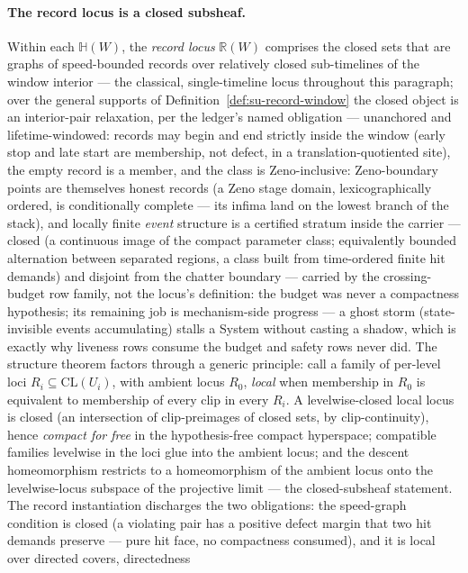 \paragraph{The record locus is a closed subsheaf.} Within each
$\mathbb{H}(W)$, the \emph{record locus} $\mathbb{R}(W)$ comprises
the closed sets that are graphs of speed-bounded records over
relatively closed sub-timelines of the window interior --- the
classical, single-timeline locus throughout this paragraph; over
the general supports of
Definition~\ref{def:su-record-window} the closed object is an
interior-pair relaxation, per the ledger's named obligation ---
unanchored and lifetime-windowed: records may begin and end strictly
inside the window (early stop and late start are membership, not
defect, in a translation-quotiented site), the empty record is a
member, and the class is Zeno-inclusive: Zeno-boundary points are
themselves honest records (a Zeno stage domain, lexicographically
ordered, is conditionally complete --- its infima land on the lowest
branch of the stack), and locally finite \emph{event}
structure is a certified stratum inside the carrier --- closed (a
continuous image of the compact parameter class; equivalently
bounded alternation between separated regions, a class built from
time-ordered finite hit demands) and disjoint from the chatter
boundary --- carried by the
crossing-budget row family, not the locus's definition: the budget
was never a compactness hypothesis; its remaining job is
mechanism-side progress --- a ghost storm (state-invisible events
accumulating) stalls a System without casting a shadow, which is
exactly why liveness rows consume the budget and safety rows never
did. The structure theorem
factors through a generic principle: call a family of per-level loci
$R_i \subseteq \mathrm{CL}(U_i)$, with ambient locus $R_0$,
\emph{local} when membership in $R_0$ is equivalent to membership of
every clip in every $R_i$. A levelwise-closed local locus is closed
(an intersection of clip-preimages of closed sets, by
clip-continuity), hence \emph{compact for free} in the hypothesis-free
compact hyperspace; compatible families levelwise in the loci glue
into the ambient locus; and the descent homeomorphism restricts to a
homeomorphism of the ambient locus onto the levelwise-locus subspace
of the projective limit --- the closed-subsheaf statement. The record
instantiation discharges the two obligations: the speed-graph
condition is closed (a violating pair has a positive defect margin
that two hit demands preserve --- pure hit face, no compactness
consumed), and it is local over directed covers, directedness
